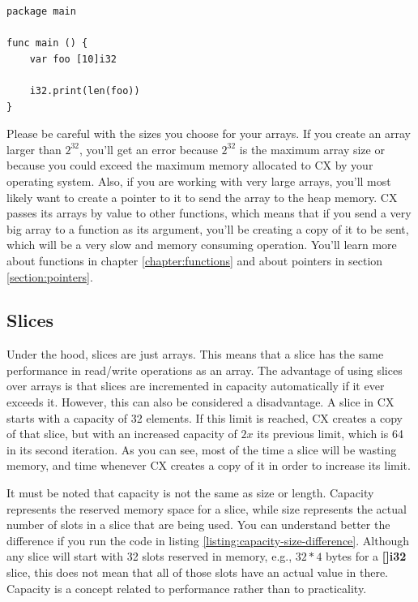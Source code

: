 \documentclass[11pt,fleqn,openany]{book} %
\begin{document}
\begin{lstlisting}[caption={Printing array length},captionpos=b,label={listing:array-len-example}]
package main

func main () {
	var foo [10]i32
    
    i32.print(len(foo))
}
\end{lstlisting}

Please be careful with the sizes you choose for your arrays. If you create an array larger than $2^{32}$, you'll get an error because $2^{32}$ is the maximum array size or because you could exceed the maximum memory allocated to CX by your operating system. Also, if you are working with very large arrays, you'll most likely want to create a pointer to it to send the array to the heap memory. CX passes its arrays by value to other functions, which means that if you send a very big array to a function as its argument, you'll be creating a copy of it to be sent, which will be a very slow and memory consuming operation. You'll learn more about functions in chapter \ref{chapter:functions} and about pointers in section \ref{section:pointers}.

\subsection{Slices}

Under the hood, slices are just arrays. This means that a slice has the same performance in read/write operations as an array. The advantage of using slices over arrays is that slices are incremented in capacity automatically if it ever exceeds it. However, this can also be considered a disadvantage. A slice in CX starts with a capacity of 32 elements. If this limit is reached, CX creates a copy of that slice, but with an increased capacity of $2x$ its previous limit, which is 64 in its second iteration. As you can see, most of the time a slice will be wasting memory, and time whenever CX creates a copy of it in order to increase its limit.

It must be noted that capacity is not the same as size or length. Capacity represents the reserved memory space for a slice, while size represents the actual number of slots in a slice that are being used. You can understand better the difference if you run the code in listing \ref{listing:capacity-size-difference}. Although any slice will start with 32 slots reserved in memory, e.g., $32*4$ bytes for a \textbf{[]i32} slice, this does not mean that all of those slots have an actual value in there. Capacity is a concept related to performance rather than to practicality.
\end{document}
